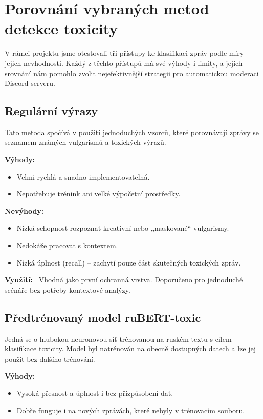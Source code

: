 \documentclass[FM,Proj]{tulthesis}
\begin{document}
\section{Porovnání vybraných metod detekce toxicity}

V rámci projektu jsme otestovali tři přístupy ke klasifikaci zpráv podle míry jejich nevhodnosti. Každý z těchto přístupů má své výhody i limity, a jejich srovnání nám pomohlo zvolit nejefektivnější strategii pro automatickou moderaci Discord serveru.
                             
\subsection{Regulární výrazy}
Tato metoda spočívá v použití jednoduchých vzorců, které porovnávají zprávy se seznamem známých vulgarismů a toxických výrazů. 

\textbf{Výhody:}
\begin{itemize}
  \item Velmi rychlá a snadno implementovatelná.
  \item Nepotřebuje trénink ani velké výpočetní prostředky.
\end{itemize}

\textbf{Nevýhody:}
\begin{itemize}
  \item Nízká schopnost rozpoznat kreativní nebo „maskované“ vulgarismy.
  \item Nedokáže pracovat s kontextem.
  \item Nízká úplnost (recall) – zachytí pouze část skutečných toxických zpráv.
\end{itemize}

\textbf{Využití:} \
Vhodná jako první ochranná vrstva. Doporučeno pro jednoduché scénáře bez potřeby kontextové analýzy.

\subsection{Předtrénovaný model ruBERT-toxic}
Jedná se o hlubokou neuronovou síť trénovanou na ruském textu s cílem klasifikace toxicity. Model byl natrénován na obecně dostupných datech a lze jej použít bez dalšího trénování.

\textbf{Výhody:}
\begin{itemize}
  \item Vysoká přesnost a úplnost i bez přizpůsobení dat.
  \item Dobře funguje i na nových zprávách, které nebyly v trénovacím souboru.
\end{itemize}
\end{document}
